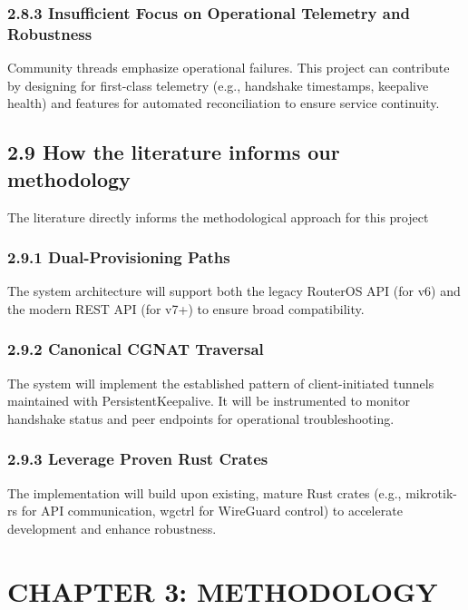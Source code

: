 \documentclass[12pt,a4paper,oneside]{report}
\begin{document}
\subsection{2.8.3 Insufficient Focus on Operational Telemetry and Robustness }

Community threads emphasize operational failures. This project can contribute by designing for first-class telemetry (e.g., handshake timestamps, keepalive health) and features for automated reconciliation to ensure service continuity.


\section{2.9 How the literature informs our methodology}

The literature directly informs the methodological approach for this project 


\subsection{2.9.1 Dual-Provisioning Paths}

The system architecture will support both the legacy RouterOS API (for v6) and the modern REST API (for v7+) to ensure broad compatibility.


\subsection{2.9.2 Canonical CGNAT Traversal}

The system will implement the established pattern of client-initiated tunnels maintained with PersistentKeepalive. It will be instrumented to monitor handshake status and peer endpoints for operational troubleshooting.


\subsection{2.9.3 Leverage Proven Rust Crates}

The implementation will build upon existing, mature Rust crates (e.g., mikrotik-rs for API communication, wgctrl for WireGuard control) to accelerate development and enhance robustness.




\chapter{CHAPTER 3: METHODOLOGY}
\end{document}
